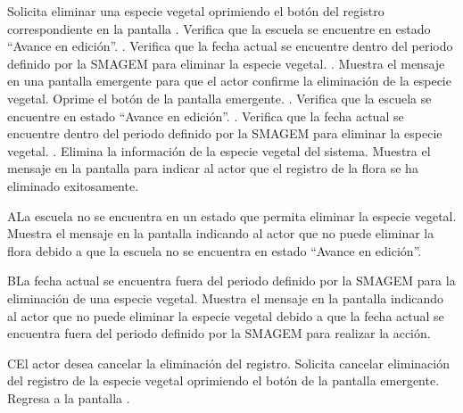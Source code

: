  \begin{UCtrayectoria}
    \UCpaso[\UCactor] Solicita eliminar una especie vegetal oprimiendo el botón \botKo del registro correspondiente en la pantalla .
    \UCpaso[\UCsist] Verifica que la escuela se encuentre en estado ``Avance en edición''. .
    \UCpaso[\UCsist] Verifica que la fecha actual se encuentre dentro del periodo definido por la SMAGEM para eliminar la especie vegetal. .
    \UCpaso[\UCsist] Muestra el mensaje  en una pantalla emergente para que el actor confirme la eliminación de la especie vegetal.
    \UCpaso[\UCactor] Oprime el botón  de la pantalla emergente. .
    \UCpaso[\UCsist] Verifica que la escuela se encuentre en estado ``Avance en edición''. .
    \UCpaso[\UCsist] Verifica que la fecha actual se encuentre dentro del periodo definido por la SMAGEM para eliminar la especie vegetal. .
    \UCpaso[\UCsist] Elimina la información de la especie vegetal del sistema.
    \UCpaso[\UCsist] Muestra el mensaje  en la pantalla  para indicar al actor que el registro de la flora se ha eliminado exitosamente. 
    
 \end{UCtrayectoria}

    \begin{UCtrayectoriaA}{A}{La escuela no se encuentra en un estado que permita eliminar la especie vegetal.}
    \UCpaso[\UCsist] Muestra el mensaje  en la pantalla  indicando al actor que no puede eliminar la flora debido a que la escuela no se encuentra en estado ``Avance en edición''. 
 \end{UCtrayectoriaA}

   \begin{UCtrayectoriaA}{B}{La fecha actual se encuentra fuera del periodo definido por la SMAGEM para la eliminación de una especie vegetal.}
    \UCpaso[\UCsist] Muestra el mensaje  en la pantalla  indicando al actor que no puede eliminar la especie vegetal debido a que la fecha actual se encuentra fuera del periodo definido por la SMAGEM para realizar la acción. 
 \end{UCtrayectoriaA}
 
    \begin{UCtrayectoriaA}{C}{El actor desea cancelar la eliminación del registro.}
    \UCpaso[\UCactor] Solicita cancelar eliminación del registro de la especie vegetal oprimiendo el botón  de la pantalla emergente.
    \UCpaso[] Regresa a la pantalla .    
 \end{UCtrayectoriaA}
